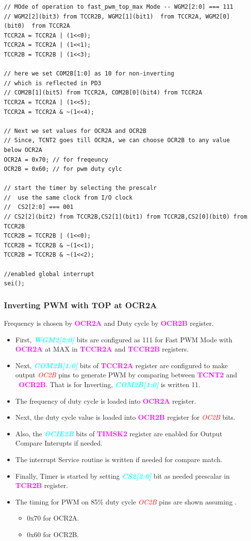 \documentclass{article}
\newcommand{\bitFormat}[1]{\emph{\textbf{\textcolor{cyan}{#1}}}}
\newcommand{\regFormat}[1]{\textbf{\textcolor{magenta}{#1}}}
\newcommand{\pinFormat}[1]{\emph{\textcolor{red}{#1}}}
\begin{document}
\begin{verbatim}
// MOde of operation to fast_pwm_top_max Mode -- WGM2[2:0] === 111
// WGM2[2](bit3) from TCCR2B, WGM2[1](bit1)  from TCCR2A, WGM2[0](bit0)  from TCCR2A
TCCR2A = TCCR2A | (1<<0);
TCCR2A = TCCR2A | (1<<1);
TCCR2B = TCCR2B | (1<<3);	

// here we set COM2B[1:0] as 10 for non-inverting
// which is reflected in PD3
// COM2B[1](bit5) from TCCR2A, COM2B[0](bit4) from TCCR2A
TCCR2A = TCCR2A | (1<<5);
TCCR2A = TCCR2A & ~(1<<4);

// Next we set values for OCR2A and OCR2B
// Since, TCNT2 goes till OCR2A, we can choose OCR2B to any value below OCR2A
OCR2A = 0x70; // for freqeuncy
OCR2B = 0x60; // for pwm duty cylc

// start the timer by selecting the prescalr
//  use the same clock from I/O clock
//  CS2[2:0] === 001
// CS2[2](bit2) from TCCR2B,CS2[1](bit1) from TCCR2B,CS2[0](bit0) from TCCR2B
TCCR2B = TCCR2B | (1<<0);
TCCR2B = TCCR2B & ~(1<<1);
TCCR2B = TCCR2B & ~(1<<2);

//enabled global interrupt
sei();
\end{verbatim}

\subsubsection{Inverting PWM with TOP at  OCR2A}
\quad Frequency is chosen by \regFormat{OCR2A} and Duty cycle by \regFormat{OCR2B} register.
\begin{itemize}
    \item First, \bitFormat{WGM2[2:0]} bits are configured as 111 for Fast PWM Mode with \regFormat{OCR2A} at MAX in \regFormat{TCCR2A} and \regFormat{TCCR2B} registers.
    \item Next, \bitFormat{COM2B[1:0]} bits of \regFormat{TCCR2A} register are configured to make output \pinFormat{OC2B} pins to generate PWM by comparing between \regFormat{TCNT2} and \ \regFormat{OCR2B}. That is for Inverting, \bitFormat{COM2B[1:0]} is written 11.
    \item The frequency of duty cycle is loaded into \regFormat{OCR2A} register.
    \item Next, the duty cycle value is loaded into \regFormat{OCR2B} register for \pinFormat{OC2B} bits.
    \item Also, the \bitFormat{OCIE2B} bits of \regFormat{TIMSK2} register  are enabled for Output Compare Interupts if needed.
    \item The interrupt Service routine is written if needed for compare match.
    \item Finally, Timer is started by setting \bitFormat{CS2[2:0]} bit as needed prescalar in \regFormat{TCR2B} register.
    \item The timing for PWM on 85\% duty cycle \pinFormat{OC2B} pins are shown assuming .
    \begin{itemize}
        \item 0x70 for OCR2A.
        \item 0x60 for OCR2B.
    \end{itemize}
\end{itemize}
\end{document}
